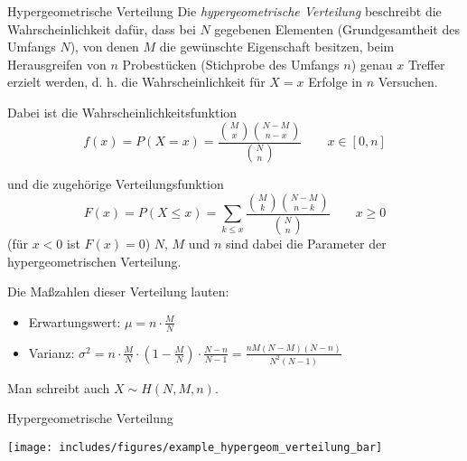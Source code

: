 \begin{defi}{Hypergeometrische Verteilung}
    Die \emph{hypergeometrische Verteilung} beschreibt die Wahrscheinlichkeit dafür, dass bei $N$ gegebenen Elementen (Grundgesamtheit des Umfangs $N$), von denen $M$ die gewünschte Eigenschaft besitzen, beim Herausgreifen von $n$ Probestücken (Stichprobe des Umfangs $n$) genau $x$ Treffer erzielt werden, d. h. die Wahrscheinlichkeit für $X = x$ Erfolge in $n$ Versuchen. 

    Dabei ist die Wahrscheinlichkeitsfunktion 
    \[ 
        f(x) = P(X = x) = \frac{\binom{M}{x} \binom{N-M}{n-x}}{\binom{N}{n}} \qquad x \in [0,n]
    \]

    und die zugehörige Verteilungsfunktion
    \[
        F(x) = P(X \leq x) = \sum_{k\leq x} \frac{\binom{M}{k} \binom{N-M}{n-k}}{\binom{N}{n}} \qquad x \geq 0
    \]
    (für $x < 0$ ist $F(x) = 0$) $N$, $M$ und $n$ sind dabei die Parameter der hypergeometrischen Verteilung. 

    Die Maßzahlen dieser Verteilung lauten: 
    \begin{itemize}
        \item Erwartungswert: $\mu = n \cdot \frac{M}{N}$
        \item Varianz: $\sigma^2 = n \cdot \frac{M}{N} \cdot \left( 1 - \frac{M}{N}\right) \cdot \frac{N-n}{N-1} = \frac{nM(N-M)(N-n)}{N^2(N-1)}$ 
    \end{itemize}

    Man schreibt auch $X \sim H(N,M,n)$.
\end{defi}

\begin{example}{Hypergeometrische Verteilung}
    \begin{center}
        \texttt{[image: includes/figures/example\_hypergeom\_verteilung\_bar]}
    \end{center}
\end{example}

